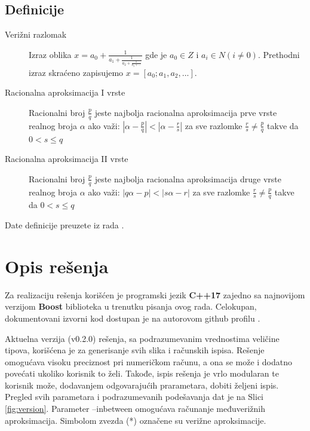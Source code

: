 \documentclass[a4paper,10pt]{article}
\begin{document}
\subsection{Definicije}
\label{definitions}
\begin{description}
\item[Verižni razlomak]
Izraz oblika $\mathit{x = a_0 + \frac{1}{a_1 + \frac{1}{a_2 + \frac{1}{a_3 + ...}}}}$ gde je $\mathit{a_0 \in Z}$ i $\mathit{a_i \in N (i \neq 0)}$. Prethodni izraz skraćeno zapisujemo $\mathit{x = [a_0;a_1,a_2, ...]}$.
\item[Racionalna aproksimacija I vrste]
Racionalni broj $\frac{p}{q}$ jeste najbolja racionalna aproksimacija prve vrste realnog broja $\mathit{\alpha}$ ako važi: $\left|\alpha - \frac{p}{q}\right| < \left|\alpha - \frac{r}{s}\right|$ za sve razlomke $\frac{r}{s} \neq \frac{p}{q}$ takve da $0 < s \leq q$
\item[Racionalna aproksimacija II vrste]
Racionalni broj $\frac{p}{q}$ jeste najbolja racionalna aproksimacija druge vrste realnog broja $\mathit{\alpha}$ ako važi: $\left|q\alpha - p\right| < \left|s\alpha - r\right|$ za sve razlomke $\frac{r}{s} \neq \frac{p}{q}$ takve da $0 < s \leq q$
\end{description} 
Date definicije preuzete iz rada \cite{ARTICLE:Verizni}.
 

\section{Opis rešenja}

Za realizaciju rešenja korišćen je programski jezik \textbf{C++17} zajedno sa najnovijom verzijom \textbf{Boost} biblioteka u trenutku pisanja ovog rada. Celokupan, dokumentovani izvorni kod dostupan je na autorovom github profilu \cite{WEBSITE:Github}.

\vspace{11pt}
Aktuelna verzija (v0.2.0) rešenja, sa podrazumevanim vrednostima veličine tipova, korišćena je za generisanje svih slika i računskih ispisa. Rešenje omogućava visoku preciznost pri numeričkom računu, a ona se može i dodatno povećati ukoliko korisnik to želi. Takođe, ispis rešenja je vrlo modularan te korisnik može, dodavanjem odgovarajućih prarametara, dobiti željeni ispis. Pregled svih parametara i podrazumevanih podešavanja dat je na Slici \ref{fig:version}. Parameter --inbetween omogućava računanje međuverižnih aproksimacija. Simbolom zvezda (*) označene su verižne aproksimacije.
\end{document}
